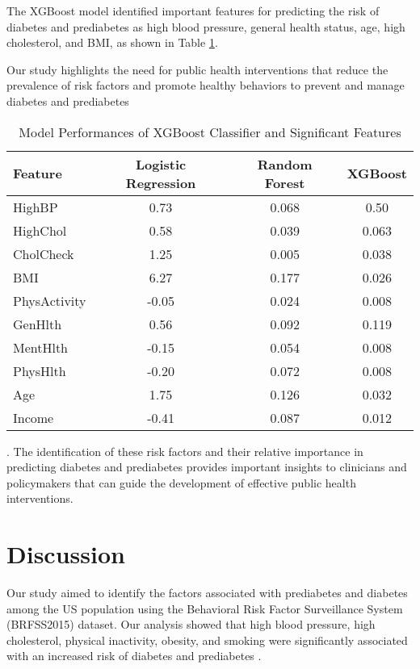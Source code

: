\documentclass[12pt]{article}
\begin{document}
The XGBoost model identified important features for predicting the risk of diabetes and prediabetes as high blood pressure, general health status, age, high cholesterol, and BMI, as shown in Table \ref{tab:xgboost-major-features}.

Our study highlights the need for public health interventions that reduce the prevalence of risk factors and promote healthy behaviors to prevent and manage diabetes and prediabetes\begin{table}[!htb]
\centering
\caption{Model Performances of XGBoost Classifier and Significant Features}
\label{tab:xgboost-major-features}
\begin{tabular}{@{}lccc@{}}
\toprule
\textbf{Feature} & \textbf{Logistic Regression} & \textbf{Random Forest} & \textbf{XGBoost} \\ \midrule
HighBP             & 0.73 & 0.068 & 0.50 \\
HighChol           & 0.58 & 0.039 & 0.063 \\
CholCheck          & 1.25 & 0.005 & 0.038 \\
BMI                & 6.27 & 0.177 & 0.026 \\
PhysActivity       & -0.05 & 0.024 & 0.008 \\
GenHlth            & 0.56 & 0.092 & 0.119 \\
MentHlth           & -0.15 & 0.054 & 0.008 \\
PhysHlth           & -0.20 & 0.072 & 0.008 \\
Age                & 1.75 & 0.126 & 0.032 \\
Income             & -0.41 & 0.087 & 0.012 \\   \bottomrule
\end{tabular}
\end{table}. The identification of these risk factors and their relative importance in predicting diabetes and prediabetes provides important insights to clinicians and policymakers that can guide the development of effective public health interventions.

\section{Discussion}

Our study aimed to identify the factors associated with prediabetes and diabetes among the US population using the Behavioral Risk Factor Surveillance System (BRFSS2015) dataset. Our analysis showed that high blood pressure, high cholesterol, physical inactivity, obesity, and smoking were significantly associated with an increased risk of diabetes and prediabetes \cite{Wisdom2008Women's, Ferdina2021Comparison, Lampert2010Smoking, BILAL2009DIABETES}.
\end{document}
